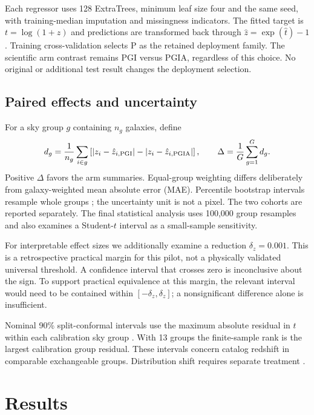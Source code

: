 \documentclass[11pt]{article}
\begin{document}
Each regressor uses 128 ExtraTrees, minimum leaf size four and the same seed,
with training-median imputation and missingness indicators. The fitted target is
$t=\log(1+z)$ and predictions are transformed back through
$\hat z=\exp(\hat t)-1$. Training cross-validation selects P as the retained
deployment family. The scientific arm contrast remains PGI versus PGIA,
regardless of this choice. No original or additional test result changes the
deployment selection.

\subsection{Paired effects and uncertainty}
For a sky group $g$ containing $n_g$ galaxies, define
\begin{equation}
 d_g=\frac{1}{n_g}\sum_{i\in g}
 \left[|z_i-\hat z_{i,\rm PGI}|-|z_i-\hat z_{i,\rm PGIA}|\right],
 \qquad \Delta=\frac{1}{G}\sum_{g=1}^G d_g.
 \label{eq:effect}
\end{equation}
Positive $\Delta$ favors the arm summaries. Equal-group weighting differs
deliberately from galaxy-weighted mean absolute error (MAE). Percentile
bootstrap intervals resample whole groups \citep{efron1979}; the uncertainty
unit is not a pixel. The two cohorts are reported separately. The final
statistical analysis uses 100,000 group resamples and also examines a
Student-$t$ interval as a small-sample sensitivity.

For interpretable effect sizes we additionally examine a reduction
$\delta_z=0.001$. This is a retrospective practical margin for this pilot,
not a physically validated universal threshold. A confidence interval that
crosses zero is inconclusive about the sign. To support practical equivalence
at this margin, the relevant interval would need to be contained within
$[-\delta_z,\delta_z]$; a nonsignificant difference alone is insufficient.

Nominal 90\% split-conformal intervals use the maximum absolute residual in
$t$ within each calibration sky group \citep{lei2018,angelopoulos2021}.
With 13 groups the finite-sample rank is the largest calibration group residual.
These intervals concern catalog redshift in comparable exchangeable groups.
Distribution shift requires separate treatment \citep{tibshirani2019}.

\section{Results}
\label{sec:results}
\end{document}

